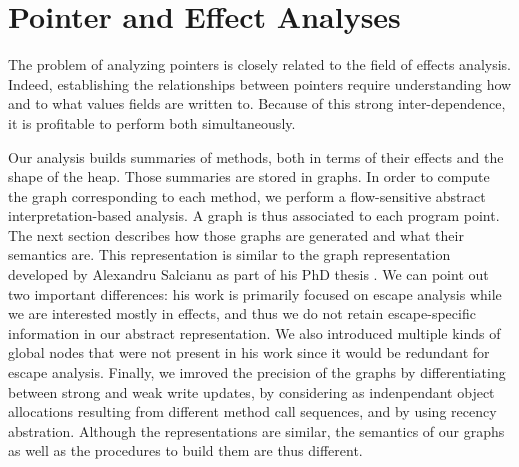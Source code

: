 \chapter{Pointer and Effect Analyses}
\label{chap:pointer}
The problem of analyzing pointers is closely related to the field of effects
analysis. Indeed, establishing the relationships between pointers require
understanding how and to what values fields are written to. Because of this
strong inter-dependence, it is profitable to perform both simultaneously.


Our analysis builds summaries of methods, both in terms of their effects and the shape of
the heap. Those summaries are stored in graphs. In order to compute the
graph corresponding to each method, we perform a flow-sensitive
abstract interpretation-based analysis. A graph is thus associated to each
program point. The next section describes how those graphs are generated and
what their semantics are. This representation is similar to
the graph representation developed by Alexandru Salcianu as part of his PhD thesis \cite{Salcianu2006}. We can %
point out two important differences: his work is primarily focused on
escape analysis while we are interested mostly in effects, and thus we do not retain escape-specific information
in our abstract representation. We also introduced multiple kinds of global
nodes that were not present in his work since it would be redundant for escape
analysis. Finally, we imroved the precision of the graphs by differentiating
between strong and weak write updates, by considering as indenpendant object
allocations resulting from different method call sequences, and by using
recency abstration. Although the representations are similar, the semantics of
our graphs as well as the procedures to build them are thus different.

\begin{lstlisting}
\end{lstlisting}


